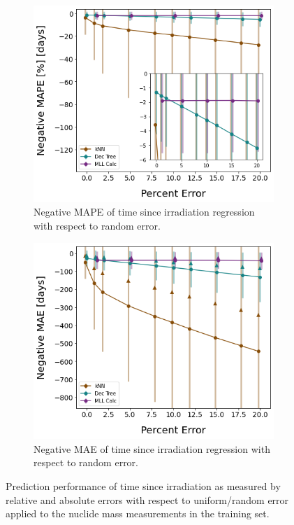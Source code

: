 \begin{figure}[!htb]
  \centering
  \begin{subfigure}[b]{0.49\textwidth}
    \centering
    \includegraphics[width=\textwidth]{./chapters/exp1/randerr_compare_nuc29_MAPE_cool.png}
    \caption{Negative \gls{MAPE} of time since irradiation regression with 
             respect to random error.} 
    \label{fig:coolmape}
  \end{subfigure}
  \hfill
  \begin{subfigure}[b]{0.49\textwidth}
    \centering
    \includegraphics[width=\textwidth]{./chapters/exp1/randerr_compare_nuc29_MAE_cool.png}
    \caption{Negative \gls{MAE} of time since irradiation regression with 
             respect to random error.} 
    \label{fig:coolmae}
  \end{subfigure}
  \caption{Prediction performance of time since irradiation as measured by 
           relative and absolute errors with respect to uniform/random error 
           applied to the nuclide mass measurements in the training set.}
  \label{fig:randcool}
\end{figure}

